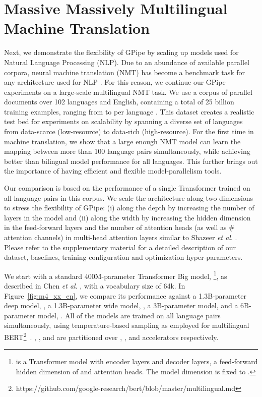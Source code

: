 \documentclass{article}
\def\codename{GPipe}
\def\onedot{.}
\def\etal{\emph{et al}\onedot}
\begin{document}
\section{Massive Massively Multilingual Machine Translation}
\label{sec:mt}
Next, we demonstrate the flexibility of \codename{} by scaling up models used for Natural Language Processing (NLP). Due to an abundance of available parallel corpora, neural machine translation (NMT) has become a benchmark task for any architecture used for NLP \cite{DBLP:journals/corr/GehringAGYD17,vaswani2017attention,shazeer2018mesh,theBestofBothWorlds18,DBLP:journals/corr/abs-1901-10430}. For this reason, we continue our \codename{} experiments on a large-scale multilingual NMT task. We use a corpus of parallel documents over 102 languages and English, containing a total of 25 billion training examples, ranging from  to  per language \cite{arivazhagan2019massively}. This dataset creates a realistic test bed for experiments on scalability by spanning a diverse set of languages from data-scarce (low-resource) to data-rich (high-resource). For the first time in machine translation, we show that a large enough NMT model can learn the mapping between more than 100 language pairs simultaneously, while achieving better than bilingual model performance for all languages. This further brings out the importance of having efficient and flexible model-parallelism tools.


Our comparison is based on the performance of a single Transformer \cite{vaswani2017attention} trained on all language pairs in this corpus. We scale the architecture along two dimensions to stress the flexibility of \codename{}: (i) along the depth by increasing the number of layers in the model and (ii) along the width by increasing the hidden dimension in the feed-forward layers and the number of attention heads (as well as \# attention channels) in multi-head attention layers similar to Shazeer \etal{} \cite{shazeer2018mesh}. Please refer to the supplementary material for a detailed description of our dataset, baselines, training configuration and optimization hyper-parameters.





We start with a standard 400M-parameter Transformer Big model, \footnote{ is a Transformer model with  encoder layers and  decoder layers, a feed-forward hidden dimension of  and  attention heads. The model dimension is fixed to .}, as described in Chen \etal{} \cite{theBestofBothWorlds18}, with a vocabulary size of 64k. In Figure~\ref{fig:m4_xx_en}, we compare its performance against a 1.3B-parameter deep model, , a 1.3B-parameter wide model, , a 3B-parameter model,  and a 6B-parameter model, . All of the models are trained on all language pairs simultaneously, using temperature-based sampling as employed for multilingual BERT\footnote{https://github.com/google-research/bert/blob/master/multilingual.md}~\cite{Devlin2018bert}. , ,  and  are partitioned over , ,  and  accelerators respectively.
\end{document}
